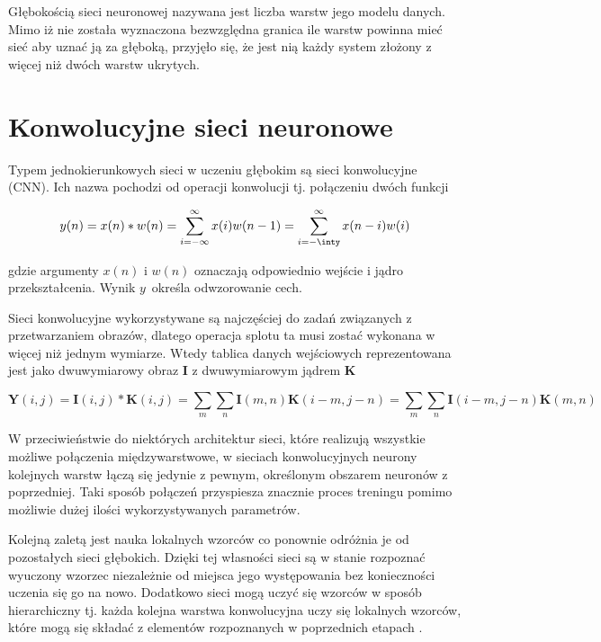 Głębokością sieci neuronowej nazywana jest liczba warstw jego modelu danych. Mimo iż nie została wyznaczona bezwzględna granica ile warstw powinna mieć sieć aby uznać ją za głęboką, przyjęło się, że jest nią każdy system złożony z więcej niż dwóch warstw ukrytych.

\section{Konwolucyjne sieci neuronowe}
\label{roz2.1}

\hspace{0.4cm}
Typem jednokierunkowych sieci w uczeniu głębokim są sieci konwolucyjne (CNN). Ich nazwa pochodzi od operacji konwolucji tj. połączeniu dwóch funkcji

\begin{equation}
    y(n) = x(n) \ast w(n) = \sum_{i=-\infty}^\infty x(i)w(n-1) = \sum_{i=-\inty}^\infty x(n-i)w(i)
\end{equation}

\noindent
gdzie argumenty $x(n)$ i $w(n)$ oznaczają odpowiednio wejście i jądro przekształcenia. Wynik $y$~określa odwzorowanie cech.  \cite{DeepLearning} 


Sieci konwolucyjne wykorzystywane są najczęściej do zadań związanych z przetwarzaniem obrazów, dlatego operacja splotu ta musi zostać wykonana w więcej niż jednym wymiarze. Wtedy tablica danych wejściowych reprezentowana jest jako dwuwymiarowy obraz \textbf{I} z dwuwymiarowym jądrem \textbf{K}

\begin{equation}
    \textbf{Y}(i,j) = \textbf{I}(i,j) \ast \textbf{K}(i,j) = \sum_m \sum_n \textbf{I}(m,n)\textbf{K}(i-m,j-n) = \sum_m \sum_n \textbf{I}(i-m,j-n)\textbf{K}(m,n)
\end{equation}

W przeciwieństwie do niektórych architektur sieci, które realizują wszystkie możliwe połączenia międzywarstwowe, w sieciach konwolucyjnych neurony kolejnych warstw łączą się jedynie z pewnym, określonym obszarem neuronów z poprzedniej. Taki sposób połączeń przyspiesza znacznie proces treningu pomimo możliwie dużej ilości wykorzystywanych parametrów. 

Kolejną zaletą jest nauka lokalnych wzorców co ponownie odróżnia je od pozostałych sieci głębokich. Dzięki tej własności sieci są w stanie rozpoznać wyuczony wzorzec niezależnie od miejsca jego występowania bez konieczności uczenia się go na nowo. Dodatkowo sieci mogą uczyć się wzorców w sposób hierarchiczny tj. każda kolejna warstwa konwolucyjna uczy się lokalnych wzorców, które mogą się składać z elementów rozpoznanych w poprzednich etapach \cite{Python}.

